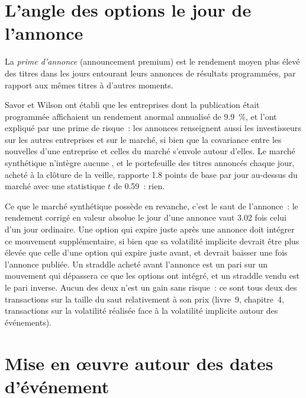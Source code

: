 \section{L'angle des options le jour de l'annonce}

\begin{definition}\label{def:s1:earnings:premium}
La \emph{prime d'annonce} (announcement premium) est le rendement moyen plus élevé des titres dans les jours entourant leurs
annonces de résultats programmées, par rapport aux mêmes titres à d'autres moments.
\end{definition}

Savor et Wilson ont établi que les entreprises dont la publication était programmée affichaient un rendement anormal annualisé de 9.9~\%, et l'ont expliqué par une prime de risque~: les annonces
renseignent aussi les investisseurs sur les autres entreprises et sur le marché, si bien que la covariance entre les nouvelles d'une entreprise et celles du marché s'envole autour d'elles. Le marché synthétique
n'intègre aucune , et le portefeuille des titres annoncés chaque jour, acheté à la clôture de la veille, rapporte 1.8 points de base par jour au-dessus du marché avec une
statistique $t$ de 0.59~: rien.

Ce que le marché synthétique possède en revanche, c'est le saut de l'annonce~: le rendement corrigé en valeur absolue le jour d'une annonce vaut 3.02 fois celui
d'un jour ordinaire. Une option qui expire juste après une annonce doit intégrer ce mouvement supplémentaire, si bien que sa volatilité implicite devrait être plus élevée que celle d'une
option qui expire juste avant, et devrait baisser une fois l'annonce publiée. Un straddle acheté avant l'annonce est un pari sur un mouvement qui dépassera ce que les options ont intégré, et un straddle vendu est
le pari inverse. Aucun des deux n'est un gain sans risque~: ce sont tous deux des transactions sur la taille du saut relativement à son prix (livre~9, chapitre~4, transactions sur la volatilité réalisée face à la volatilité implicite autour des événements).

\section{Mise en œuvre autour des dates d'événement}

